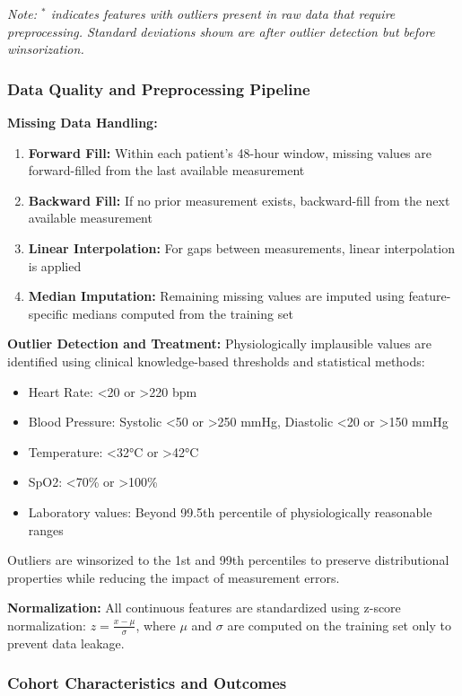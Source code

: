 \documentclass[letterpaper]{article}
\begin{document}
\textit{Note: $^*$ indicates features with outliers present in raw data that require preprocessing. Standard deviations shown are after outlier detection but before winsorization.}

\subsubsection{Data Quality and Preprocessing Pipeline}

\textbf{Missing Data Handling:}
\begin{enumerate}
    \item \textbf{Forward Fill:} Within each patient's 48-hour window, missing values are forward-filled from the last available measurement
    \item \textbf{Backward Fill:} If no prior measurement exists, backward-fill from the next available measurement  
    \item \textbf{Linear Interpolation:} For gaps between measurements, linear interpolation is applied
    \item \textbf{Median Imputation:} Remaining missing values are imputed using feature-specific medians computed from the training set
\end{enumerate}

\textbf{Outlier Detection and Treatment:}
Physiologically implausible values are identified using clinical knowledge-based thresholds and statistical methods:
\begin{itemize}
    \item Heart Rate: <20 or >220 bpm
    \item Blood Pressure: Systolic <50 or >250 mmHg, Diastolic <20 or >150 mmHg
    \item Temperature: <32°C or >42°C  
    \item SpO2: <70\% or >100\%
    \item Laboratory values: Beyond 99.5th percentile of physiologically reasonable ranges
\end{itemize}

Outliers are winsorized to the 1st and 99th percentiles to preserve distributional properties while reducing the impact of measurement errors.

\textbf{Normalization:}
All continuous features are standardized using z-score normalization: $z = \frac{x - \mu}{\sigma}$, where $\mu$ and $\sigma$ are computed on the training set only to prevent data leakage.

\subsubsection{Cohort Characteristics and Outcomes}
\end{document}
